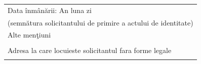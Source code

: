 \documentclass[11pt,a4paper]{article}
\newcommand{\fillline}[1][6cm]{\underline{\hspace{#1}}}
\newcommand{\fillbox}[1][0.4cm]{\framebox[#1]{\rule{0pt}{#1}}}
\begin{document}
\begin{tabularx}{\textwidth}{|m{3cm}|X|}
\multicolumn{2}{|l|}{Data înmânării: \hspace{0.3cm} An \fillbox\fillbox\fillbox\fillbox \hspace{0.3cm} luna \fillbox\fillbox \hspace{0.3cm} zi \fillbox\fillbox \hfill \fillline[5cm]} \\
\multicolumn{2}{|l|}{\hfill \footnotesize (semnătura solicitantului de primire a actului de identitate)} \\
\hline
\multicolumn{2}{|l|}{Alte menţiuni} \\
\multicolumn{2}{|p{\textwidth}|}{\vspace{1.5cm}} \\
\hline
\multicolumn{2}{|l|}{Adresa la care locuieste solicitantul fara forme legale} \\
\multicolumn{2}{|p{\textwidth}|}{\vspace{1.5cm}} \\
\hline
\end{tabularx}
\end{document}
